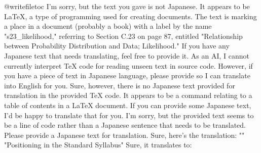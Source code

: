 \relax
\providecommand\hyper@newdestlabel[2]{}
@writefile{toc}{\protected@file@percent }
I'm sorry, but the text you gave is not Japanese. It appears to be LaTeX, a type of programming used for creating documents. The text is marking a place in a document (probably a book) with a label by the name "s23_likelihood," referring to Section C.23 on page 87, entitled "Relationship between Probability Distribution and Data; Likelihood." If you have any Japanese text that needs translating, feel free to provide it.
As an AI, I cannot currently interpret TeX code for reading unseen text in source code. However, if you have a piece of text in Japanese language, please provide so I can translate into English for you.
Sure, however, there is no Japanese text provided for translation in the provided TeX code. It appears to be a command relating to a table of contents in a LaTeX document. If you can provide some Japanese text, I'd be happy to translate that for you.
I'm sorry, but the provided text seems to be a line of code rather than a Japanese sentence that needs to be translated. Please provide a Japanese text for translation.
Sure, here's the translation: "\protected@file@percent"
"Positioning in the Standard Syllabus"
Sure, it translates to:

